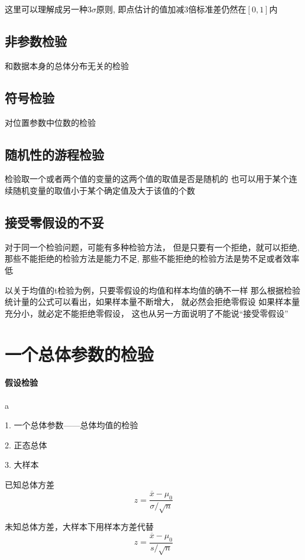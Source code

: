 \documentclass[UTF8,10pt]{book}
\begin{document}
        这里可以理解成另一种$3\sigma$原则,
        即点估计的值加减3倍标准差仍然在$[0,1]$内
        
        \subsection{非参数检验}	
        
        和数据本身的总体分布无关的检验
        
        \subsection{符号检验}	
        对位置参数中位数的检验

        \subsection{随机性的游程检验}	
        检验取一个或者两个值的变量的这两个值的取值是否是随机的 
        也可以用于某个连续随机变量的取值小于某个确定值及大于该值的个数
        
        \subsection{接受零假设的不妥}	
        对于同一个检验问题，可能有多种检验方法，
        但是只要有一个拒绝，就可以拒绝,
        那些不能拒绝的检验方法是能力不足,
        那些不能拒绝的检验方法是势不足或者效率低

        {\kaishu 以关于均值的t检验为例，只要零假设的均值和样本均值的确不一样	
        那么根据检验统计量的公式可以看出，如果样本量不断增大，
        就必然会拒绝零假设 如果样本量充分小，就必定不能拒绝零假设，
        这也从另一方面说明了不能说“接受零假设”}
    \section{一个总体参数的检验}
        \paragraph{假设检验} a
        
        1. 一个总体参数——总体均值的检验 

        2. 正态总体 

        3. 大样本	
        
        已知总体方差 $$ z = \frac{\overline{x}-\mu_0}{\sigma / \sqrt{n}} $$ 

        未知总体方差，大样本下用样本方差代替 $$ z = \frac{\overline{x}-\mu_0}{s / \sqrt{n}} $$
\end{document}
